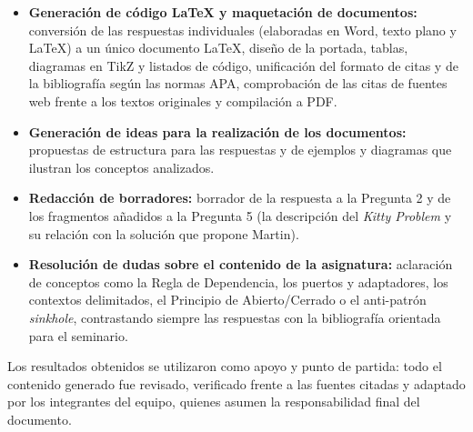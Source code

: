 \documentclass[11pt,a4paper]{article}
\begin{document}
\begin{itemize}[leftmargin=1.4em]
\item \textbf{Generación de código \LaTeX{} y maquetación de documentos:} conversión de las
respuestas individuales (elaboradas en Word, texto plano y \LaTeX{}) a un único documento
\LaTeX{}, diseño de la portada, tablas, diagramas en TikZ y listados de código, unificación del
formato de citas y de la bibliografía según las normas APA, comprobación de las citas de
fuentes web frente a los textos originales y compilación a PDF.
\item \textbf{Generación de ideas para la realización de los documentos:} propuestas de
estructura para las respuestas y de ejemplos y diagramas que ilustran los conceptos
analizados.
\item \textbf{Redacción de borradores:} borrador de la respuesta a la Pregunta 2 y de los
fragmentos añadidos a la Pregunta 5 (la descripción del \emph{Kitty Problem} y su relación con
la solución que propone Martin).
\item \textbf{Resolución de dudas sobre el contenido de la asignatura:} aclaración de conceptos
como la Regla de Dependencia, los puertos y adaptadores, los contextos delimitados, el Principio
de Abierto/Cerrado o el anti-patrón \emph{sinkhole}, contrastando siempre las respuestas con la
bibliografía orientada para el seminario.
\end{itemize}

Los resultados obtenidos se utilizaron como apoyo y punto de partida: todo el contenido
generado fue revisado, verificado frente a las fuentes citadas y adaptado por los integrantes
del equipo, quienes asumen la responsabilidad final del documento.
\end{document}
